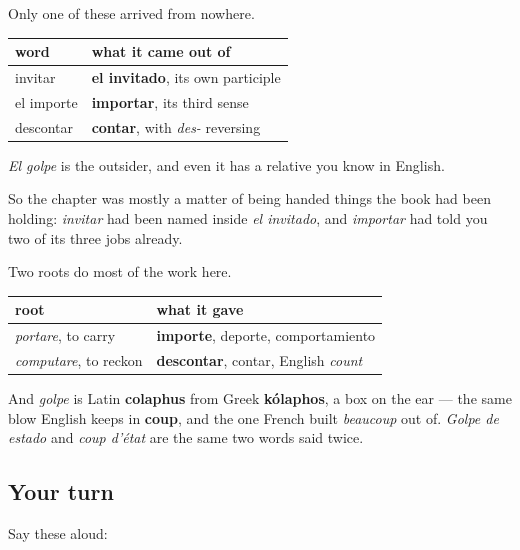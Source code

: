 \begin{grammarlens}[title={Grammar Lens: three of the four were already in the room}]
Only one of these arrived from nowhere.

\noindent
\begin{tabularx}{\linewidth}{@{}>{\raggedright\arraybackslash}X>{\raggedright\arraybackslash}X@{}}
\toprule
\textbf{word} & \textbf{what it came out of} \\
\midrule
invitar & \textbf{el invitado}, its own participle \\
el importe & \textbf{importar}, its third sense \\
descontar & \textbf{contar}, with \emph{des-} reversing \\
\bottomrule
\end{tabularx}

\emph{El golpe} is the outsider, and even it has a relative you know in English.

So the chapter was mostly a matter of being handed things the book had been holding: \emph{invitar} had been named inside \emph{el invitado}, and \emph{importar} had told you two of its three jobs already.
\end{grammarlens}

\begin{cousinweb}
Two roots do most of the work here.

\noindent
\begin{tabularx}{\linewidth}{@{}>{\raggedright\arraybackslash}X>{\raggedright\arraybackslash}X@{}}
\toprule
\textbf{root} & \textbf{what it gave} \\
\midrule
\emph{portare}, to carry & \textbf{importe}, deporte, comportamiento \\
\emph{computare}, to reckon & \textbf{descontar}, contar, English \emph{count} \\
\bottomrule
\end{tabularx}

And \emph{golpe} is Latin \textbf{colaphus} from Greek \textbf{kólaphos}, a box on the ear — the same blow English keeps in \textbf{coup}, and the one French built \emph{beaucoup} out of. \emph{Golpe de estado} and \emph{coup d'état} are the same two words said twice.
\end{cousinweb}

\subsection*{Your turn}
Say these aloud:

